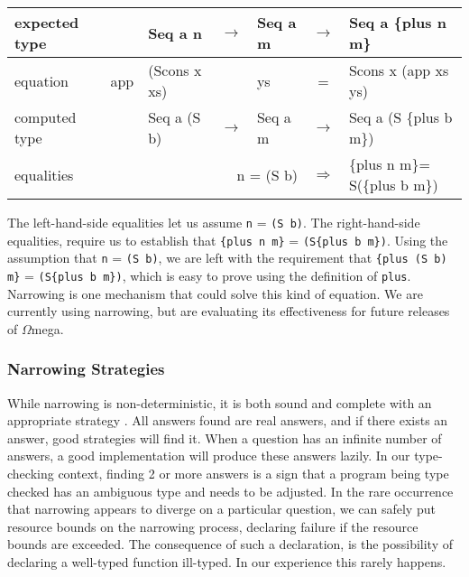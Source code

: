 \documentclass[11pt,twoside]{article}
\newcommand{\om}{$\Omega$mega}
\newcommand{\plus}[2]{\{plus {#1} {#2}\}}
\begin{document}
\vspace*{.1in}
\begin{tabular}{|l|rlclcl|} \hline
{\small expected type} & &{\small{{Seq a n}}} & $\rightarrow$ & {\small{{Seq a m}}} & $\rightarrow$ &  {\small{{Seq a \plus{n}{m}}}}\\ \hline
{\small equation} & {\small{app}}&  {\small{{(Scons x xs)}}} & &  {\small{{ys}}} & = & {\small{{Scons x (app xs ys)}}} \\ \hline
{\small computed type} & & {\small{{Seq a (S b)}}} & $\rightarrow$ & {\small{{Seq a m}}} & $\rightarrow$ & {\small{{Seq a (S \plus{b}{m})}}}  \\ \hline
{\small equalities}    & & \multicolumn{3}{r}{\small{{n = (S b)}}} & $\Rightarrow$ & {\small{{\plus{n}{m}= S(\plus{b}{m})}}} \\ \hline
\end{tabular}
\vspace*{.1in}

The left-hand-side equalities let us
assume \verb+n+ = \verb+(S b)+. The right-hand-side equalities, require us
to establish that \verb+{plus n m}+ = \verb+(S{plus b m})+.   Using the assumption that
\verb+n+ = \verb+(S b)+, we are left with the requirement that \verb+{plus (S b) m}+ = \verb+(S{plus b m})+,
which is easy to prove using the definition of \verb+plus+. Narrowing is one
mechanism that could solve this kind of equation. We are currently using
narrowing, but are evaluating its effectiveness for future releases of \om.

\subsubsection{Narrowing Strategies} \label{ISEQ}

While narrowing is non-deterministic, it is both sound and complete with an
appropriate strategy \cite{Antoy:2005:ESF}. All answers found are real answers, and if
there exists an answer, good strategies will find it. When a question has an infinite
number of answers, a good implementation will produce these answers lazily.  In our
type-checking context, finding 2 or more answers is a sign that a program being type
checked has an ambiguous type and needs to be adjusted. In the rare occurrence that
narrowing appears to diverge on a particular question, we can safely put resource
bounds on the narrowing process, declaring failure if the resource bounds are
exceeded. The consequence of such a declaration, is the possibility of declaring a
well-typed function ill-typed. In our experience this rarely happens.
\end{document}
